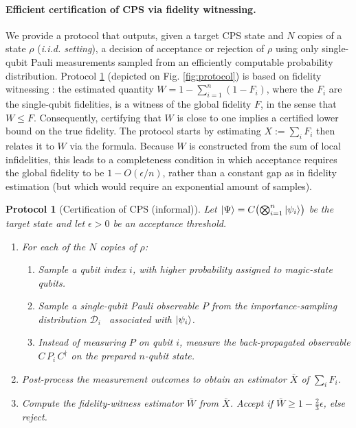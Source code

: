 \documentclass[a4paper]{article}
\newtheorem{protocol}{Protocol}
\newcommand{\pdist}{\mathcal D} %
\begin{document}
\paragraph{Efficient certification of CPS via fidelity witnessing.}
We provide a protocol that outputs, given a target CPS state and \(N\) copies of a state \(\rho\) (\emph{i.i.d. setting}), a decision of acceptance or rejection of $\rho$ using only single-qubit Pauli measurements sampled from an efficiently computable probability distribution.
Protocol \ref{protocol:certification} (depicted on Fig. \ref{fig:protocol}) is based on fidelity witnessing \cite{CGKM21efficient}: the estimated quantity
$W = 1 - \sum_{i=1}^n (1-F_i)$,
where the $F_i$ are the single-qubit fidelities, is a witness of the global fidelity $F$, in the sense that $W\leq F$.
Consequently, certifying that $W$ is close to one implies a certified lower bound on the true fidelity. The protocol starts by estimating $X:=\sum_i F_i$ then relates it to $W$ via the formula.
Because \(W\) is constructed from the sum of local infidelities, this leads to a completeness condition in which acceptance requires the global fidelity to be \(1-O(\epsilon/n)\), rather than a constant gap as in fidelity estimation (but which would require an exponential amount of samples).


\begin{protocol}[Certification of CPS (informal)]
\label{protocol:certification}
Let $\ket\Psi = C\bigl(\bigotimes_{i=1}^n\ket{\psi_i}\bigr)$ be the target state and let $\epsilon>0$ be an acceptance threshold.
\begin{enumerate}
    \item For each of the $N$ copies of $\rho$:
    \begin{enumerate}
        \item Sample a qubit index $i$, with higher probability assigned to magic-state qubits.
        \item Sample a single-qubit Pauli observable $P$ from the importance-sampling distribution $\pdist_i$~\cite{FOS24optimal} associated with $\ket{\psi_i}$.
        \item Instead of measuring $P$ on qubit $i$, measure the back-propagated observable
        $C\,P_i\,C^\dagger$ on the prepared $n$-qubit state.
        \label{item:backpropagatino}
    \end{enumerate}
    \item Post-process the measurement outcomes to obtain an estimator $\bar X$ of $\sum_i F_i$.
    \item Compute the fidelity-witness estimator $\bar W$ from $\bar X$. Accept if $\bar W \ge 1-\tfrac23\epsilon$, else reject.
\end{enumerate}
\end{protocol}
\end{document}
